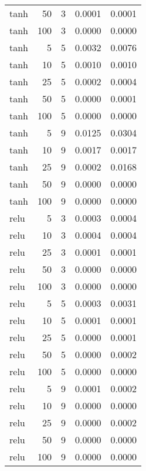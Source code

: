 \begin{tabular}{lrrrr}
tanh & 50 & 3 & 0.0001 & 0.0001 \\
tanh & 100 & 3 & 0.0000 & 0.0000 \\
tanh & 5 & 5 & 0.0032 & 0.0076 \\
tanh & 10 & 5 & 0.0010 & 0.0010 \\
tanh & 25 & 5 & 0.0002 & 0.0004 \\
tanh & 50 & 5 & 0.0000 & 0.0001 \\
tanh & 100 & 5 & 0.0000 & 0.0000 \\
tanh & 5 & 9 & 0.0125 & 0.0304 \\
tanh & 10 & 9 & 0.0017 & 0.0017 \\
tanh & 25 & 9 & 0.0002 & 0.0168 \\
tanh & 50 & 9 & 0.0000 & 0.0000 \\
tanh & 100 & 9 & 0.0000 & 0.0000 \\
relu & 5 & 3 & 0.0003 & 0.0004 \\
relu & 10 & 3 & 0.0004 & 0.0004 \\
relu & 25 & 3 & 0.0001 & 0.0001 \\
relu & 50 & 3 & 0.0000 & 0.0000 \\
relu & 100 & 3 & 0.0000 & 0.0000 \\
relu & 5 & 5 & 0.0003 & 0.0031 \\
relu & 10 & 5 & 0.0001 & 0.0001 \\
relu & 25 & 5 & 0.0000 & 0.0001 \\
relu & 50 & 5 & 0.0000 & 0.0002 \\
relu & 100 & 5 & 0.0000 & 0.0000 \\
relu & 5 & 9 & 0.0001 & 0.0002 \\
relu & 10 & 9 & 0.0000 & 0.0000 \\
relu & 25 & 9 & 0.0000 & 0.0002 \\
relu & 50 & 9 & 0.0000 & 0.0000 \\
relu & 100 & 9 & 0.0000 & 0.0000 \\
\bottomrule
\end{tabular}
